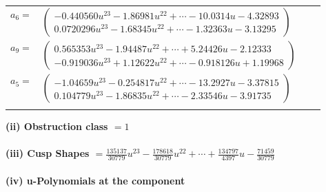 \documentclass[1p]{elsarticle_modified}
\theoremstyle{definition}
\begin{document}
\begin{tabular}{m{7pt} m{180pt} m{7pt} m{180pt} }
\flushright $a_{6}=$&$\begin{pmatrix}-0.440560 u^{23}-1.86981 u^{22}+\cdots-10.0314 u-4.32893\\0.0720296 u^{23}-1.68345 u^{22}+\cdots-1.32363 u-3.13295\end{pmatrix}$ \\
\flushright $a_{9}=$&$\begin{pmatrix}0.565353 u^{23}-1.94487 u^{22}+\cdots+5.24426 u-2.12333\\-0.919036 u^{23}+1.12622 u^{22}+\cdots-0.918126 u+1.19968\end{pmatrix}$ \\
\flushright $a_{5}=$&$\begin{pmatrix}-1.04659 u^{23}-0.254817 u^{22}+\cdots-13.2927 u-3.37815\\0.104779 u^{23}-1.86835 u^{22}+\cdots-2.33546 u-3.91735\end{pmatrix}$\\&\end{tabular}
\flushleft \textbf{(ii) Obstruction class $= 1$}\\~\\
\flushleft \textbf{(iii) Cusp Shapes $= \frac{135137}{30779} u^{23}-\frac{178618}{30779} u^{22}+\cdots+\frac{134797}{4397} u-\frac{71459}{30779}$}\\~\\
\newpage\renewcommand{\arraystretch}{1}
\flushleft \textbf{(iv) u-Polynomials at the component}\newline \\
\end{document}
